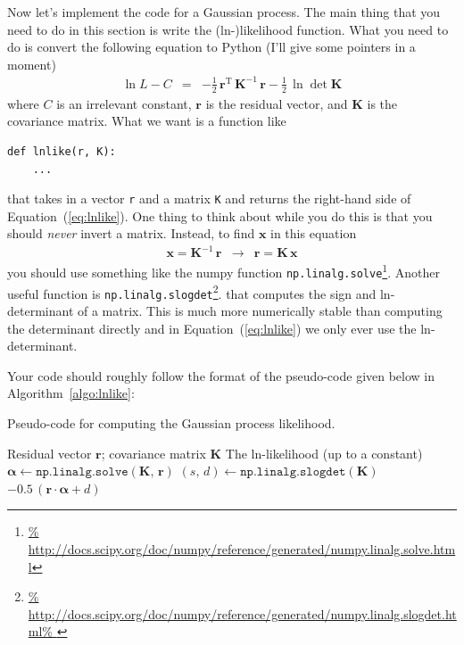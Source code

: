 \documentclass[12pt,preprint]{aastex}
\newcommand{\project}[1]{{\sffamily #1}}
\newcommand{\Eq}[1]{Equation~(\ref{eq:#1})}
\newcommand{\eq}[1]{\Eq{#1}}
\newcommand{\eqlabel}[1]{\label{eq:#1}}
\newcommand{\bvec}[1]{\ensuremath{\boldsymbol{#1}}}
\begin{document}
Now let's implement the code for a Gaussian process.
The main thing that you need to do in this section is write the
(ln-)likelihood function.
What you need to do is convert the following equation to Python (I'll give
some pointers in a moment)
\begin{eqnarray}\eqlabel{lnlike}
\ln L - C &=& -\frac{1}{2}\,\bvec{r}^\mathrm{T}\,\bvec{K}^{-1}\,\bvec{r}
              -\frac{1}{2}\,\ln \det \bvec{K}
\end{eqnarray}
where $C$ is an irrelevant constant, $\bvec{r}$ is the residual vector, and
$\bvec{K}$ is the covariance matrix.
What we want is a function like
\begin{lstlisting}
def lnlike(r, K):
    ...
\end{lstlisting}
that takes in a vector \texttt{r} and a matrix \texttt{K} and returns the
right-hand side of \eq{lnlike}.
One thing to think about while you do this is that you should \emph{never}
invert a matrix.
Instead, to find $\bvec{x}$ in this equation
\begin{eqnarray}
\bvec{x} = \bvec{K}^{-1}\,\bvec{r} &\to& \bvec{r} = \bvec{K}\,\bvec{x}
\end{eqnarray}
you should use something like the \project{numpy} function
\texttt{np.linalg.solve}\footnote{\url{%
http://docs.scipy.org/doc/numpy/reference/generated/numpy.linalg.solve.html}}.
Another useful function is \texttt{np.linalg.slogdet}\footnote{\url{%
http://docs.scipy.org/doc/numpy/reference/generated/numpy.linalg.slogdet.html%
}}.
that computes the sign and ln-determinant of a matrix.
This is much more numerically stable than computing the determinant directly
and in \eq{lnlike} we only ever use the ln-determinant.

Your code should roughly follow the format of the pseudo-code given below in
Algorithm~\ref{algo:lnlike}:
\begin{algorithm}
\caption{Pseudo-code for computing the Gaussian process likelihood.
         \label{algo:lnlike}}
\begin{algorithmic}[1]

\REQUIRE Residual vector \bvec{r}; covariance matrix \bvec{K}
\ENSURE The ln-likelihood (up to a constant)
\STATE $\bvec{\alpha} \gets \mathtt{np.linalg.solve}(\bvec{K},\,\bvec{r})$
\STATE $(s,\,d) \gets \mathtt{np.linalg.slogdet}(\bvec{K})$
\RETURN $-0.5\,\left(\bvec{r}\cdot\bvec{\alpha} + d\right)$

\end{algorithmic}
\end{algorithm}
\end{document}
